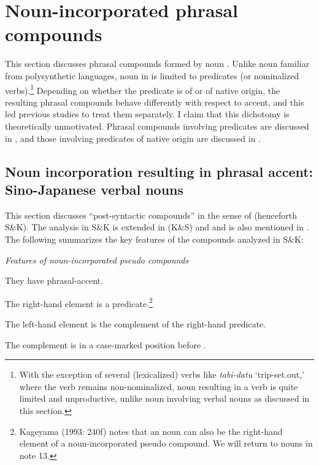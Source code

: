 \documentclass[output=paper]{LSP/langsci}
\begin{document}
\section{Noun-incorporated phrasal compounds} \label{sec:nishiyama:3}
This section discusses phrasal compounds formed by noun . Unlike noun  familiar from polysynthetic languages, noun  in  is limited to  predicates (or nominalized verbs).\footnote{With the exception of several (lexicalized) verbs like \textit{tabi-datu} ‘trip-set.out,’ where the verb remains non-nominalized, noun  resulting in a verb is quite limited and unproductive, unlike noun  involving verbal nouns as discussed in this section.} Depending on whether the predicate is of  or of native origin, the resulting phrasal compounds behave differently with respect to accent, and this led previous studies to treat them separately. I claim that this dichotomy is theoretically unmotivated. Phrasal compounds involving  predicates are discussed in , and those involving predicates of native origin are discussed in .

\subsection{Noun incorporation resulting in phrasal accent: Sino-Japanese verbal nouns}\label{sec:nishiyama:3.1}
This section discusses “post-syntactic compounds” in the sense of \citet{ShibataniKageyama1988} (henceforth S\&K). The analysis in S\&K is extended in \citet{KageyamaShibatani1989} (K\&S) and \citet{Kageyama1993} and is also mentioned in \citet{Kageyama2009}. The following summarizes the key features of the compounds analyzed in S\&K:

\ea\label{ex:nishiyama:11}
 \textit{Features of noun-incorporated pseudo compounds}

  \ea  They have phrasal-accent.

  \ex  The right-hand element is a   predicate.\footnote{Kageyama (1993: 240f) notes that an  noun can also be the right-hand element of a noun-incorporated pseudo compound. We will return to  nouns in note 13.}

  \ex  The left-hand element is the complement of the right-hand predicate.

  \ex  The complement is in a case-marked position before .
\z \z
\end{document}
